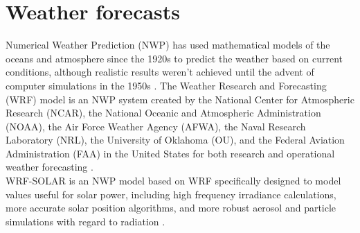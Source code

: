 \section{Weather forecasts\label{cha:WRF}}
Numerical Weather Prediction (NWP) has used mathematical models of the oceans and atmosphere since the 1920s to predict the weather based on current conditions, although realistic results weren't achieved until the advent of computer simulations in the 1950s \cite{noauthor_numerical_2022}. The Weather Research and Forecasting (WRF) model is an NWP system created by the National Center for Atmospheric Research (NCAR), the National Oceanic and Atmospheric Administration (NOAA), the Air Force Weather Agency (AFWA), the Naval Research Laboratory (NRL), the University of Oklahoma (OU), and the Federal Aviation Administration (FAA) in the United States for both research and operational weather forecasting \cite{noauthor_weather_2022}.\\
WRF-SOLAR is an NWP model based on WRF specifically designed to model values useful for solar power, including high frequency irradiance calculations, more accurate solar position algorithms, and more robust aerosol and particle simulations with regard to radiation \cite{jimenez_wrf-solar_2016}.
